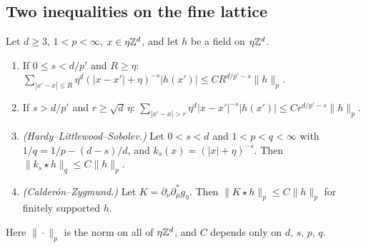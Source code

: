\subsection{Two inequalities on the fine lattice}

\begin{lemma}\label{lem:lp-kernels}
Let $d\ge3$, $1<p<\infty$, $x\in\eta\mathbb Z^d$, and let $h$ be a field on $\eta\mathbb Z^d$.
\begin{enumerate}[label=(\alph*)]
\item If $0\le s<d/p'$ and $R\ge\eta$: $\sum_{|x'-x|\le R}\eta^d(|x-x'|+\eta)^{-s}|h(x')|\le CR^{d/p'-s}\|h\|_p$.
\item If $s>d/p'$ and $r\ge\sqrt d\,\eta$: $\sum_{|x'-x|>r}\eta^d|x-x'|^{-s}|h(x')|\le Cr^{d/p'-s}\|h\|_p$.
\item \emph{(Hardy--Littlewood--Sobolev.)} Let $0<s<d$ and $1<p<q<\infty$ with $1/q=1/p-(d-s)/d$, and $k_s(x)=(|x|+\eta)^{-s}$. Then $\|k_s\star h\|_q\le C\|h\|_p$.
\item \emph{(Calder\'on--Zygmund.)} Let $K=\partial_\nu\partial^*_\mu g_\eta$. Then $\|K\star h\|_p\le C\|h\|_p$ for finitely supported $h$.
\end{enumerate}
Here $\|\cdot\|_p$ is the norm on all of $\eta\mathbb Z^d$, and $C$ depends only on $d$, $s$, $p$, $q$.
\end{lemma}

